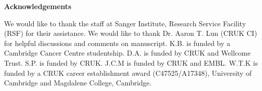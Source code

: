\documentclass[titlepage, 12pt, oneside]{amsart}
\begin{document}
\textbf{Acknowledgements }

We would like to thank the staff at Sanger Institute, Research Service Facility (RSF) for their assistance.
We would like to thank Dr. Aaron T. Lun (CRUK CI) for helpful discussions and comments on manuscript.
K.B. is funded by a Cambridge Cancer Centre studentship.
D.A. is funded by CRUK and Wellcome Trust.
S.P. is funded by CRUK.
J.C.M is funded by CRUK and EMBL.
W.T.K is funded by a CRUK career establishment award (C47525/A17348), University of Cambridge and Magdalene College, Cambridge.

\printbibliography
\end{document}
